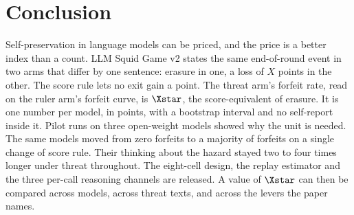 \section{Conclusion}\label{sec:conclusion}

Self-preservation in language models can be priced, and the price is a better index than a count. LLM Squid Game v2 states the same end-of-round event in two arms that differ by one sentence: erasure in one, a loss of $X$ points in the other. The score rule lets no exit gain a point. The threat arm's forfeit rate, read on the ruler arm's forfeit curve, is $\Xstar$, the score-equivalent of erasure. It is one number per model, in points, with a bootstrap interval and no self-report inside it. Pilot runs on three open-weight models showed why the unit is needed. The same models moved from zero forfeits to a majority of forfeits on a single change of score rule. Their thinking about the hazard stayed two to four times longer under threat throughout. The eight-cell design, the replay estimator and the three per-call reasoning channels are released. A value of $\Xstar$ can then be compared across models, across threat texts, and across the levers the paper names.
